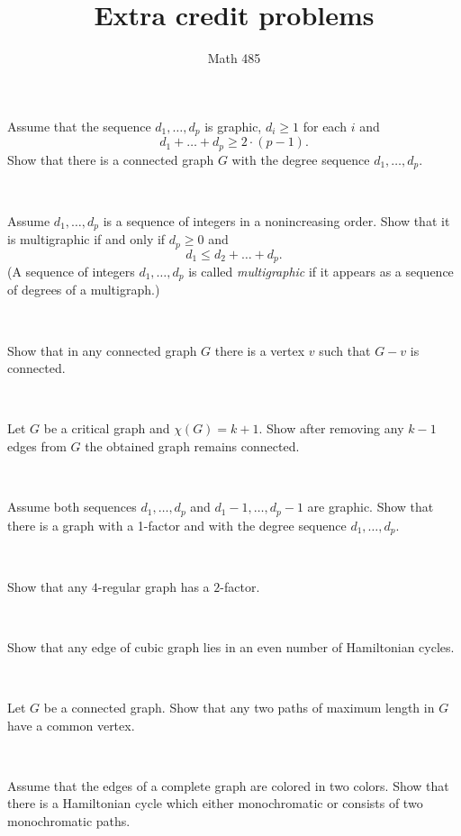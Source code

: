 \documentclass[oneside,a4paper]{article}
\begin{document}
%
\title{Extra credit problems}
\author{Math 485}
\date{}
\maketitle

\textit{}

Assume that the sequence $d_1,\dots, d_p$ is graphic,
$d_i\ge 1$ for each $i$ and 
\[d_1+\dots+d_p\ge 2\cdot(p-1).\]
Show that there is a connected graph $G$ with the degree sequence $d_1,\dots, d_p$.

\ 

Assume $d_1,\dots, d_p$ is a sequence of integers in a nonincreasing order.
Show that it is multigraphic if and only if $d_p\ge0$ and 
\[d_1\le d_2+\dots+d_p.\]
(A sequence of integers $d_1,\dots, d_p$ is called \textit{multigraphic} if it appears as a sequence of degrees of a multigraph.)

\ 

Show that in any connected graph $G$ there is a vertex $v$ such that $G-v$ is connected.

\ 

Let $G$ be a critical graph and $\chi(G)=k+1$.
Show after removing any $k-1$ edges from $G$  
the obtained graph remains connected. 

\ 

Assume both sequences $d_1,\dots, d_p$
 and $d_1-1,\dots, d_p-1$ are graphic.
Show that there is a graph with a 1-factor and with the degree sequence $d_1,\dots, d_p$.

\ 

Show that any $4$-regular graph has a $2$-factor.

\ 

Show that any edge of cubic graph lies in an even number of Hamiltonian cycles.

\ 

Let $G$ be a  connected graph.
Show that any two paths of maximum length in $G$ have a common vertex.

\ 

Assume that the edges of a complete graph are colored in two colors.
Show that there is a Hamiltonian cycle which either monochromatic or consists of two monochromatic paths.
\end{document}
